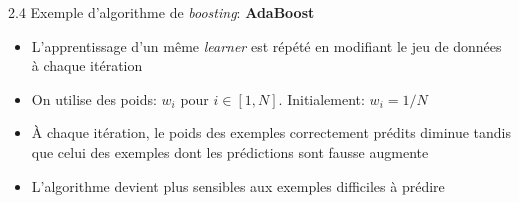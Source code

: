 \begin{frame}{2.4 Exemple d'algorithme de \textit{boosting}: \textbf{AdaBoost}}
  \begin{itemize}
  \item L'apprentissage d'un même \textit{learner} est répété en modifiant le jeu de données à chaque itération
  \item On utilise des poids: $w_{i}$ pour $i \in [1,N]$. Initialement: $w_{i} = 1/N$
  \item À chaque itération, le poids des exemples correctement prédits diminue tandis que celui des exemples dont les prédictions sont fausse augmente
  \item L'algorithme devient plus sensibles aux exemples difficiles à prédire
  \end{itemize}
\end{frame}


